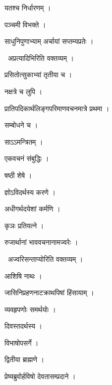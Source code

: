 \documentclass[10pt, openany, oneside]{book}
\begin{document}
\noindent यतश्च निर्धारणम् ।

\noindent पञ्चमी विभक्ते ।

\noindent साधुनिपुणाभ्याम् अर्चायां सप्तम्यप्रतेः ।

\par\noindent\hspace{1.5em}{\vps वा॰}~{\qt अप्रत्यादिभिरिति वक्तव्यम् ।}

\noindent प्रसितोत्सुकाभ्यां तृतीया च ।

\noindent नक्षत्रे च लुपि ।

\noindent प्रातिपदिकार्थलिङ्गपरिमाणवचनमात्रे प्रथमा ।

\noindent सम्बोधने च ।

\noindent साऽऽमन्त्रितम् ।

\noindent एकवचनं संबुद्धिः ।

\noindent षष्ठी शेषे ।

\noindent ज्ञोऽविदर्थस्य करणे ।

\noindent अधीगर्थदयेशां कर्मणि ।

\noindent कृञः प्रतियत्ने ।

\noindent रुजार्थानां भाववचनानामज्वरेः ।

\par\noindent\hspace{1.5em}{\vps वा॰}~{\qt अज्वरिसन्ताप्योरिति वक्तव्यम् ।}

\noindent आशिषि नाथः ।

\noindent जासिनिप्रहणनाटक्राथपिषां हिंसायाम् ।

\noindent व्यवहृपणोः समर्थयोः ।

\noindent दिवस्तदर्थस्य ।

\noindent विभाषोपसर्गे ।

\noindent द्वितीया ब्राह्मणे ।

\noindent प्रेष्यब्रुवोर्हविषो देवतासम्प्रदाने ।
\end{document}
